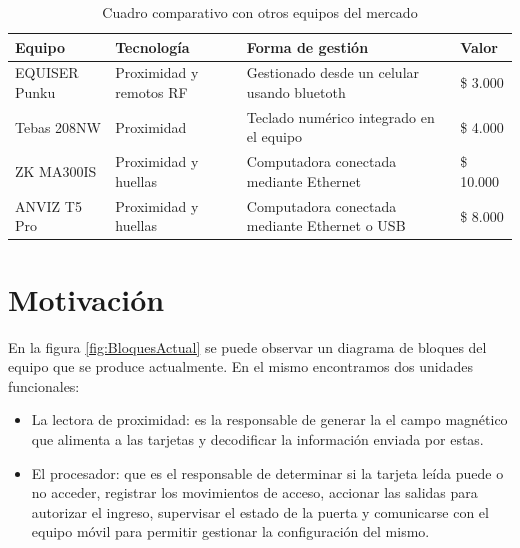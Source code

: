 \begin{table}[ht]
	\centering
	\caption{Cuadro comparativo con otros equipos del mercado}
	\begin{tabular}{C{25mm} C{25mm} C{50mm} C{20mm}}    
		\toprule
		\textbf{Equipo}  
			& \textbf{Tecnología} 
			& \textbf{Forma de gestión}
			& \textbf{Valor}  \\
		\midrule
		EQUISER \newline Punku 
			& Proximidad y remotos RF
			& Gestionado desde un \newline celular usando bluetoth
			& \$ 3.000\\
		Tebas \newline 208NW \cite{TEBAS}
			& Proximidad
			& Teclado numérico \newline integrado en el equipo
			& \$ 4.000\\
		ZK \newline MA300IS \cite{ZK}
			& Proximidad \newline y huellas
			& Computadora conectada \newline mediante Ethernet
			& \$ 10.000\\
		ANVIZ \newline T5 Pro \cite{ANVIZ}
			& Proximidad \newline y huellas
			& Computadora conectada \newline mediante Ethernet o USB
			& \$ 8.000\\
		\bottomrule
		
		\hline
	\end{tabular}
	\label{tab:ComparacionActual}
\end{table}

\section{Motivación}
\label{sec:motivacion}

En la figura \ref{fig:BloquesActual} se puede observar un diagrama de bloques del equipo que se produce actualmente. En el mismo encontramos dos unidades funcionales: 

\begin{itemize}
	\item La lectora de proximidad: es la responsable de generar la el campo magnético que alimenta a las tarjetas y decodificar la información enviada por estas.
	\item El procesador: que es el responsable de determinar si la tarjeta leída puede o no acceder, registrar los movimientos de acceso, accionar las salidas para autorizar el ingreso, supervisar el estado de la puerta y comunicarse con el equipo móvil para permitir gestionar la configuración del mismo.
\end{itemize}

